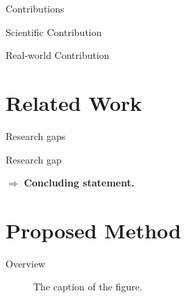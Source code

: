 \documentclass{beamer}
\begin{document}
\begin{frame}{Contributions}				
    \begin{block}{Scientific Contribution}
    \end{block}						
    \begin{block}{Real-world Contribution}
    \end{block}					
    \note{}
\end{frame}

\section{Related Work}

\begin{frame}{Research gaps}
    \begin{alertblock}{Research gap}
    \end{alertblock}
                                                                
    $\Rightarrow$ \textbf{Concluding statement.}
                                                                
    \note{}
\end{frame}
         
\section{Proposed Method} 

\begin{frame}{Overview}
    \begin{figure}
        \centering
        \caption{The caption of the figure.}
    \end{figure}	
    \note{}
\end{frame}
\end{document}
